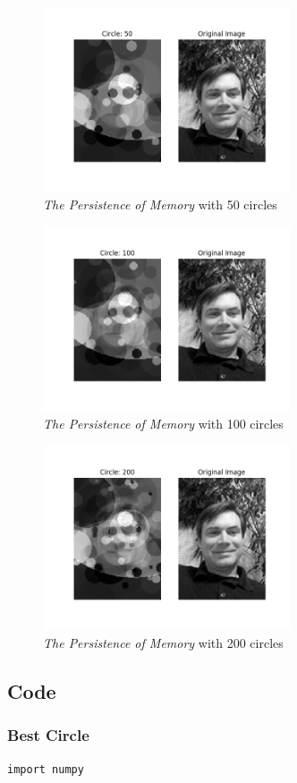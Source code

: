 \documentclass[12pt]{article}
\begin{document}
\begin{figure}[H]
\centering
\noindent\includegraphics[width=0.65\textwidth]{./results/jmcgough_50}
\caption{\textit{The Persistence of Memory} with 50 circles}
\label{fig:jmcgough_50}
\end{figure}

\begin{figure}[H]
\centering
\noindent\includegraphics[width=0.65\textwidth]{./results/jmcgough_100}
\caption{\textit{The Persistence of Memory} with 100 circles}
\label{fig:jmcgough_100}
\end{figure}

\begin{figure}[H]
\centering
\noindent\includegraphics[width=0.65\textwidth]{./results/jmcgough_200}
\caption{\textit{The Persistence of Memory} with 200 circles}
\label{fig:jmcgough_200}
\end{figure}



\newpage
\subsection{Code}
\subsubsection{Best Circle}
\begin{lstlisting}
import numpy
\end{lstlisting}
\end{document}
